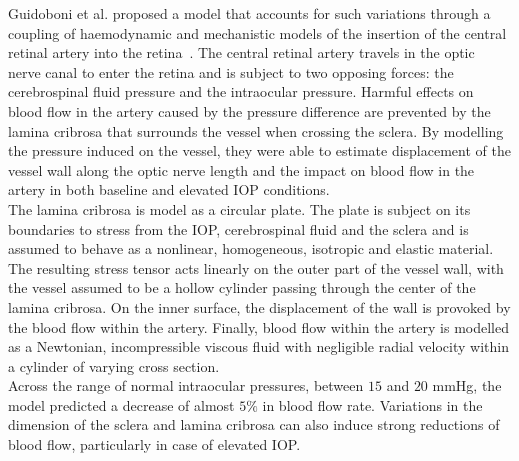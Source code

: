 \documentclass[12pt,a4paper]{article}
\begin{document}
Guidoboni et al. proposed a model that accounts for such variations through a coupling of haemodynamic and mechanistic models of the insertion of the central retinal artery into the retina~\cite{Guidoboni_2014}.
The central retinal artery travels in the optic nerve canal to enter the retina and is subject to two opposing forces: the cerebrospinal fluid pressure and the intraocular pressure.
Harmful effects on blood flow in the artery caused by the pressure difference are prevented by the lamina cribrosa that surrounds the vessel when crossing the sclera.
By modelling the pressure induced on the vessel, they were able to estimate displacement of the vessel wall along the optic nerve length and the impact on blood flow in the artery in both baseline and elevated IOP conditions.\\
The lamina cribrosa is model as a circular plate.
The plate is subject on its boundaries to stress from the IOP, cerebrospinal fluid and the sclera and is assumed to behave as a nonlinear, homogeneous, isotropic and elastic material.
The resulting stress tensor acts linearly on the outer part of the vessel wall, with the vessel assumed to be a hollow cylinder passing through the center of the lamina cribrosa.
On the inner surface, the displacement of the wall is provoked by the blood flow within the artery.
Finally, blood flow within the artery is modelled as a Newtonian, incompressible viscous fluid with negligible radial velocity within a cylinder of varying cross section.\\
Across the range of normal intraocular pressures, between $15$ and $20$ mmHg, the model predicted a decrease of almost $5\%$ in blood flow rate.
Variations in the dimension of the sclera and lamina cribrosa can also induce strong reductions of blood flow, particularly in case of elevated IOP. \\
\end{document}
